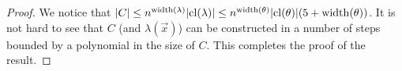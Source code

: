 \documentclass[../paper.tex]{subfiles}
\begin{document}
\begin{proof}
We notice that $\vert C \vert \leq n^{\mathrm{width}(\lambda)} \vert \mathrm{cl}(\lambda) \vert
\leq n^{\mathrm{width}(\theta)} \vert \mathrm{cl}(\theta) \vert (5 + \mathrm{width}(\theta))$. It is not
hard to see that $C$ (and $\lambda(\vec{x})$) can be constructed in a number of
steps bounded by a polynomial in the size of $C$. This completes the proof of
the result.






  




\end{proof}
\end{document}

